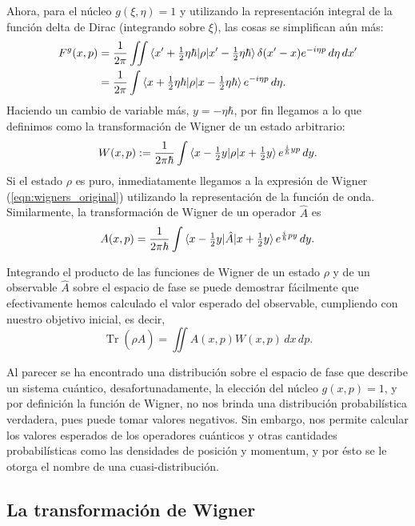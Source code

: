 \documentclass[a4paper]{report}
\DeclareMathOperator{\Tr}{Tr}
\begin{document}
  Ahora, para el núcleo $g(\xi,\eta) = 1$ y utilizando la
  representación integral de la función delta de Dirac
  (integrando sobre $\xi$), las cosas se simplifican aún
  más:
  \begin{align}
    F^{g}(x,p)
    &= \frac{1}{2\pi} \iint \braket{
    x'+\tfrac{1}{2}\eta\hbar | \rho|
    x'-\tfrac{1}{2}\eta\hbar} \delta(x'-x) e^{-i\eta p} \,
    d\eta \, dx' \\
    &= \frac{1}{2 \pi} \int \braket{x +
    \tfrac{1}{2}\eta\hbar | \rho | x - \tfrac{1}{2}
    \eta\hbar}e^{-i \eta p} \, d\eta.
  \end{align}
  Haciendo un cambio de variable más, $y = -\eta \hbar$, por
  fin llegamos a lo que definimos como la transformación de
  Wigner de un estado arbitrario:
  \begin{equation}
    W(x,p)
    := \frac{1}{2\pi\hbar} \int \braket{x -
      \tfrac{1}{2}y|\rho|x+\tfrac{1}{2}y} e^{\frac{i}{\hbar}
    y p} \, dy.
  \end{equation}
  Si el estado $\rho$ es puro, inmediatamente llegamos a la
  expresión de Wigner (\ref{eqn:wigners_original})
  utilizando la representación de la función de onda.
  Similarmente, la transformación de Wigner de un operador
  $\hat{A}$ es
  \begin{equation}
    A(x,p)
    = \frac{1}{2 \pi \hbar} \int
    \braket{x-\tfrac{1}{2}y|\hat{A}|x+\tfrac{1}{2}y}
    e^{\frac{i}{\hbar}p y} \, dy.
  \end{equation}

  Integrando el producto de las funciones de Wigner de un
  estado $\rho$ y de un observable $\hat{A}$ sobre el
  espacio de fase se puede demostrar fácilmente que
  efectivamente hemos calculado el valor esperado del
  observable, cumpliendo con nuestro objetivo inicial, es
  decir,
  \[
    \Tr\left( \rho\hat{A} \right) 
    = \iint A(x,p)W(x,p) \, dx \, dp.
  \] 

  Al parecer se ha encontrado una distribución sobre el
  espacio de fase que describe un sistema cuántico,
  desafortunadamente, la elección del núcleo $g(x,p) = 1$, y
  por definición la función de Wigner, no nos brinda una
  distribución probabilística verdadera, pues puede tomar
  valores negativos. Sin embargo, nos permite calcular los
  valores esperados de los operadores cuánticos y otras
  cantidades probabilísticas como las densidades de posición
  y momentum, y por ésto se le otorga el nombre de una
  cuasi-distribución.

  \subsection{La transformación de Wigner}
\end{document}
